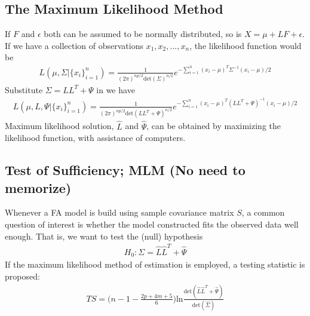\documentclass[12pt]{extarticle}
\newcommand{\<}{\langle}
\renewcommand{\>}{\rangle}
\theoremstyle{definition}
\begin{document}
\subsection{The Maximum Likelihood Method}
If $F$ and $\epsilon$ both can be assumed to be normally distributed, so is $X = \mu +LF+\epsilon$.\\
If we have a collection of observations $x_1,x_2,...,x_n$, the likelihood function would be
\begin{align*}
    L(\mu,\Sigma|\{x_i\}^n_{i=1})=\frac{1}{(2\pi)^{np/2} \text{det}(\Sigma)^{n/2}}e^{-\sum^n_{i=1}(x_i -\mu)^T \Sigma^{-1}(x_i -\mu)/2}
\end{align*}
Substitute $\Sigma =LL^T +\Psi$ in we have
\begin{align*}
    L(\mu,L,\Psi|\{x_i\}^n_{i=1}) = \frac{1}{(2\pi)^{np/2} \text{det}(LL^T +\Psi)^{n/2}}e^{-\sum^n_{i=1}(x_i -\mu)^T (LL^T +\Psi)^{-1}(x_i -\mu)/2}
\end{align*}
Maximum likelihood solution, $\hat{L}$ and $\hat{\Psi}$, can be obtained by maximizing the likelihood function, with assistance of computers.

\subsection{Test of Sufficiency; MLM (No need to memorize)}
\begin{tcolorbox}[enhanced, drop fuzzy shadow, title=Test of Sufficiency]
Whenever a FA model is build using sample covariance matrix $S$, a common question of interest is whether the model constructed fits the observed data well enough. That is, we want to test the (null) hypothesis
\begin{align*}
    H_0: \Sigma=\hat{L}\hat{L}^T +\hat{\Psi}
\end{align*}
If the maximum likelihood method of estimation is employed, a testing statistic is proposed:
\begin{align*}
    TS = \bigg(n-1-\frac{2p+4m+5}{6}\bigg)\text{ln}\frac{\text{det}(\hat{L}\hat{L}^T +\hat{\Psi})}{\text{det}(\hat{\Sigma})}
\end{align*}
\end{tcolorbox}
\end{document}
